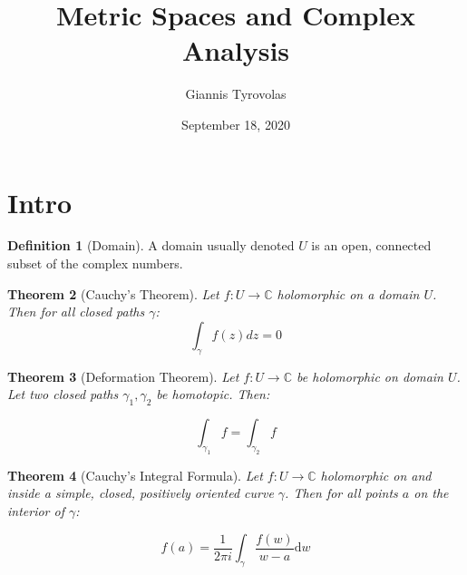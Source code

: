 \documentclass[11pt,a4paper, titlepage]{article}
\title{Metric Spaces and Complex Analysis}
\author{Giannis Tyrovolas}
\date{September 18, 2020}
\newtheorem{theorem}{Theorem}[section]
\theoremstyle{definition}
\newtheorem{definition}[theorem]{Definition}
\begin{document}
\maketitle

\section{Intro}

\begin{definition}[Domain]
A domain usually denoted $U$ is an open, connected subset of the complex numbers.
\end{definition}

\begin{theorem}[Cauchy's Theorem]

Let $ f \colon U \longrightarrow \mathbb{C}$ holomorphic on a domain $U$. Then for all closed paths $\gamma$:
\[
	\int_\gamma f(z) dz = 0
\]

\end{theorem}

\begin{theorem}[Deformation Theorem]

Let $f \colon U \longrightarrow \mathbb{C}$ be holomorphic on domain $U$. Let two closed paths $\gamma_1, \gamma_2 $ be homotopic. Then:

\[
	\int_{\gamma_1} f = \int_{\gamma_2} f
\]	

\end{theorem}

\begin{theorem}[Cauchy's Integral Formula]

Let $f \colon U \longrightarrow \mathbb{C}$ holomorphic on and inside a simple, closed, positively oriented curve $\gamma$. Then for all points $a$ on the interior of $\gamma$:

\[
	f(a) = \frac{1}{2\pi i} \int_\gamma \frac{f(w)}{w-a} \mathrm{d}w
\]	

\end{theorem}
\end{document}
